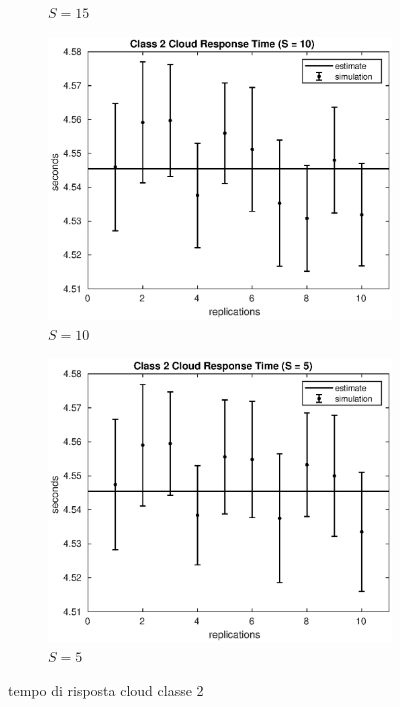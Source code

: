 \begin{figure}[!h]
\begin{subfigure}[t]{0.49\textwidth}
\caption{$S = 15$}
\label{15_s2cloud}
\end{subfigure}
%
\begin{subfigure}[t]{0.49\textwidth}
\includegraphics[width=\textwidth]{figures/simul/10_500K_s2cloud}
\caption{$S = 10$}
\label{10_s2cloud}
\end{subfigure}
%
\begin{subfigure}[t]{0.49\textwidth}
\includegraphics[width=\textwidth]{figures/simul/5_500K_s2cloud}
\caption{$S = 5$}
\label{5_s2cloud}
\end{subfigure}
%
\caption{tempo di risposta cloud classe 2}
\label{plot:s2cloud}
\end{figure}
%
%


